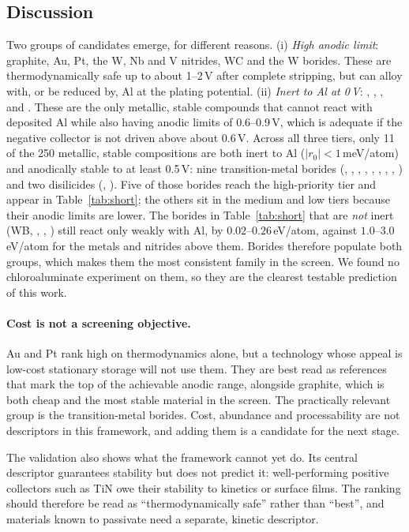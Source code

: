 \subsection{Discussion}
Two groups of candidates emerge, for different reasons. (i) \emph{High anodic limit}: graphite, Au, Pt, the W, Nb and V nitrides, WC and the W borides. These are thermodynamically safe up to about 1--2\,V after complete stripping, but can alloy with, or be reduced by, Al at the plating potential. (ii) \emph{Inert to Al at 0\,V}: , , ,  and . These are the only metallic, stable compounds that cannot react with deposited Al while also having anodic limits of 0.6--0.9\,V, which is adequate if the negative collector is not driven above about 0.6\,V. Across all three tiers, only 11 of the 250 metallic, stable compositions are both inert to Al ($|r_0| < 1$\,meV/atom) and anodically stable to at least 0.5\,V: nine transition-metal borides (, , , , , , , , ) and two disilicides (, ). Five of those borides reach the high-priority tier and appear in Table~\ref{tab:short}; the others sit in the medium and low tiers because their anodic limits are lower. The borides in Table~\ref{tab:short} that are \emph{not} inert (WB, , , ) still react only weakly with Al, by $0.02$--$0.26$\,eV/atom, against $1.0$--$3.0$\,eV/atom for the metals and nitrides above them. Borides therefore populate both groups, which makes them the most consistent family in the screen. We found no chloroaluminate experiment on them, so they are the clearest testable prediction of this work.

\paragraph{Cost is not a screening objective.} Au and Pt rank high on thermodynamics alone, but a technology whose appeal is low-cost stationary storage will not use them. They are best read as references that mark the top of the achievable anodic range, alongside graphite, which is both cheap and the most stable material in the screen. The practically relevant group is the transition-metal borides. Cost, abundance and processability are not descriptors in this framework, and adding them is a candidate for the next stage.

The validation also shows what the framework cannot yet do. Its central descriptor guarantees stability but does not predict it: well-performing positive collectors such as TiN owe their stability to kinetics or surface films. The ranking should therefore be read as ``thermodynamically safe'' rather than ``best'', and materials known to passivate need a separate, kinetic descriptor.

